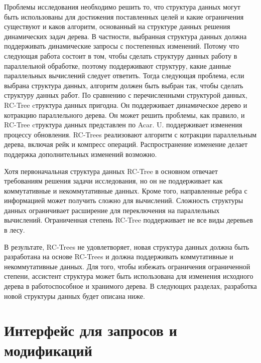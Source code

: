 \documentclass[specification,annotation]{itmo-student-thesis}
\newcommand{\revise}[1]{{\color{red!70!black} #1 }}
\begin{document}
\revise{
Проблемы исследования необходимо решить то, что структура данных могут быть использованы для достижения поставленных целей и какие ограничения существуют и каков алгоритм, основанный на структуре данных 
решения динамических задач дерева. В частности, выбранная структура данных должна поддерживать динамические запросы с постепенных изменений. Потому что следующая работа состоит в том, чтобы сделать 
структуру данных работу в параллельной обработке, поэтому поддерживают структуру, какие данные параллельных вычислений следует ответить. Тогда следующая проблема, если выбрана структура данных, алгоритм 
должен быть выбран так, чтобы сделать структуру данных работ. По сравнению с перечисленными структурой данных, RC-Tree cтруктура данных пригодна. Он поддерживает динамическое дерево и котракцию 
параллельного дерева. Он может решить проблемы, как правило, и RC-Tree cтруктура данных представлен по Acar. U. поддерживает изменения процессу обновления. RC-Trees реализовают алгоритм с котракции 
параллельным дерева, включая рейк и компресс операций. Распространение изменение делает поддержка дополнительных изменений возможно.
}

\revise{
Хотя первоначальная структура данных RC-Tree в основном отвечает требованиям решения задачи исследования, но он не поддерживает как коммутативные и некоммутативные данных. Кроме того, направленные ребра с 
информацией может получить сложно для вычислений. Сложность структуры данных ограничивает расширение для переключения на параллельных вычислений. Ограниченная степень RC-Tree поддерживает не все виды 
деревьев в лесу.
}

\revise{
В результате, RC-Trees не удовлетворяет, новая структура данных должна быть разработана на основе RC-Trees и должна поддерживать коммутативные и некоммутативные данных. Для того, чтобы избежать 
ограничения ограниченной степени, ассистент структура может быть использована для изменения исходного дерева в работоспособное и хранимого дерева. В следующих разделах, разработка новой структуры данных 
будет описана ниже.
}

\section{Интерфейс для запросов и модификаций}
\end{document}
